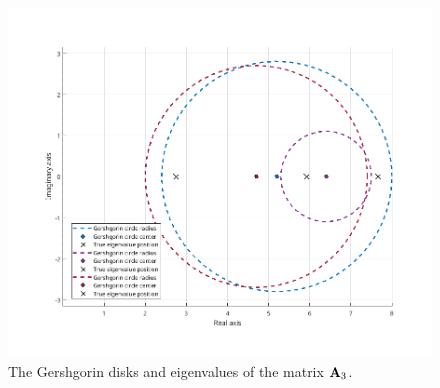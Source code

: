 \begin{figure}[H]
    \centering
    \includegraphics[width=1\textwidth]{problems/Figures/Problem_7/last_matrix.png}
    \caption{The Gershgorin disks and eigenvalues of the matrix $\mathbf{A}_3$.}
\end{figure}
